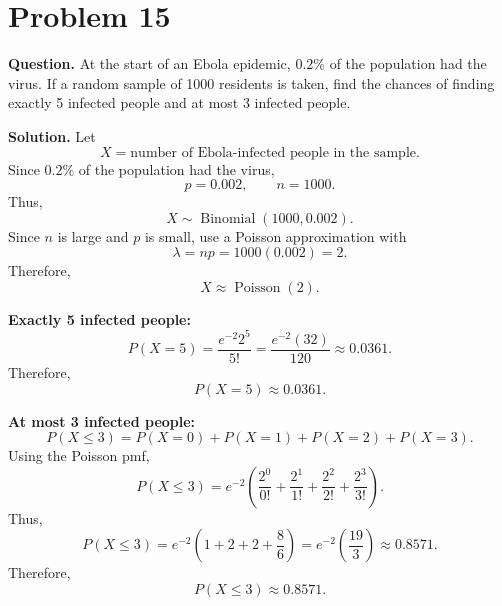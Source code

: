 \documentclass[11pt]{article}
\begin{document}
\section*{Problem 15}

\textbf{Question.} At the start of an Ebola epidemic, $0.2\%$ of the population had the virus. If a random sample of 1000 residents is taken, find the chances of finding exactly 5 infected people and at most 3 infected people.

\textbf{Solution.} Let
\[
X=\text{number of Ebola-infected people in the sample}.
\]
Since $0.2\%$ of the population had the virus,
\[
p=0.002, \qquad n=1000.
\]
Thus,
\[
X\sim \operatorname{Binomial}(1000,0.002).
\]
Since $n$ is large and $p$ is small, use a Poisson approximation with
\[
\lambda=np=1000(0.002)=2.
\]
Therefore,
\[
X\approx \operatorname{Poisson}(2).
\]

\textbf{Exactly 5 infected people:}
\[
P(X=5)=\frac{e^{-2}2^5}{5!}=\frac{e^{-2}(32)}{120}\approx 0.0361.
\]
Therefore,
\[
\boxed{P(X=5)\approx 0.0361}.
\]

\textbf{At most 3 infected people:}
\[
P(X\le 3)=P(X=0)+P(X=1)+P(X=2)+P(X=3).
\]
Using the Poisson pmf,
\[
P(X\le 3)=e^{-2}\left(\frac{2^0}{0!}+\frac{2^1}{1!}+\frac{2^2}{2!}+\frac{2^3}{3!}\right).
\]
Thus,
\[
P(X\le 3)=e^{-2}\left(1+2+2+\frac{8}{6}\right)=e^{-2}\left(\frac{19}{3}\right)\approx 0.8571.
\]
Therefore,
\[
\boxed{P(X\le 3)\approx 0.8571}.
\]

\newpage
\end{document}
